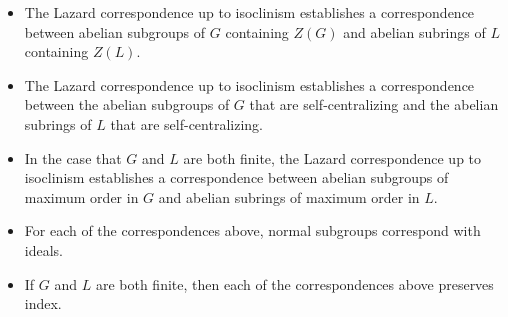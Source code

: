 \documentclass{ucetd}
\begin{document}
\begin{itemize}
\item The Lazard correspondence up to isoclinism establishes a
  correspondence between abelian subgroups of $G$ containing $Z(G)$
  and abelian subrings of $L$ containing $Z(L)$.
\item The Lazard correspondence up to isoclinism establishes a
  correspondence between the abelian subgroups of $G$ that are
  self-centralizing and the abelian subrings of $L$ that are
  self-centralizing.
\item In the case that $G$ and $L$ are both finite, the Lazard
  correspondence up to isoclinism establishes a correspondence between
  abelian subgroups of maximum order in $G$ and abelian subrings of
  maximum order in $L$.
\item For each of the correspondences above, normal subgroups
  correspond with ideals.
\item If $G$ and $L$ are both finite, then each of the correspondences
  above preserves index.
\end{itemize}




\end{document}
